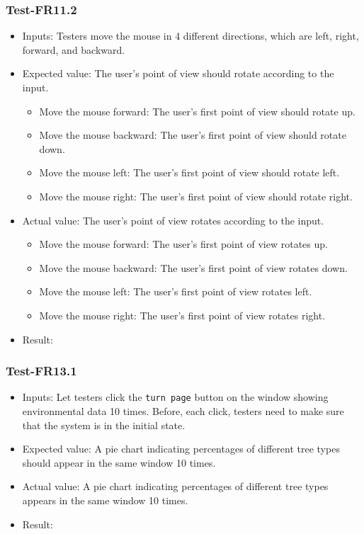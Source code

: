 \documentclass[12pt, titlepage]{article}
\begin{document}
\subsubsection{Test-FR11.2}
\begin{itemize}
    \item Inputs: Testers move the mouse in 4 different directions, which are left, right, forward, and
backward.
    \item Expected value: The user's point of view should rotate according to the input. 
    \begin{itemize}
    \item Move the mouse forward: The user's first point of view should rotate up.
    \item Move the mouse backward: The user's first point of view should rotate 
    down.
    \item Move the mouse left: The user's first point of view should rotate left.
    \item Move the mouse right: The user's first point of view should rotate right.
\end{itemize}

    \item Actual value: The user's point of view rotates according to the input. 
    \begin{itemize}
    \item Move the mouse forward: The user's first point of view rotates up.
    \item Move the mouse backward: The user's first point of view rotates
    down.
    \item Move the mouse left: The user's first point of view rotates left.
    \item Move the mouse right: The user's first point of view rotates right.
\end{itemize}

    \item Result: \pass
\end{itemize}

\subsubsection{Test-FR13.1}
\begin{itemize}
    \item Inputs: Let testers click the \verb|turn page| button on the window showing
    environmental data 10 times. Before, each click, testers need to make sure that
    the system is in the initial state.
    \item Expected value: A pie chart indicating percentages of different tree types should appear in the same window 10 times.
    \item Actual value: A pie chart indicating percentages of different tree types appears in the same window 10 times.
    \item Result: \pass
\end{itemize}
\end{document}
